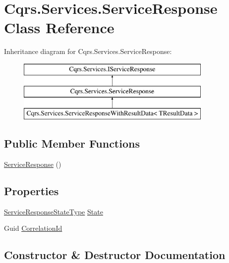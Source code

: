\hypertarget{classCqrs_1_1Services_1_1ServiceResponse}{}\section{Cqrs.\+Services.\+Service\+Response Class Reference}
\label{classCqrs_1_1Services_1_1ServiceResponse}
Inheritance diagram for Cqrs.\+Services.\+Service\+Response\+:\begin{figure}[H]
\begin{center}
\leavevmode
\includegraphics[height=3.000000cm]{classCqrs_1_1Services_1_1ServiceResponse}
\end{center}
\end{figure}
\subsection*{Public Member Functions}
\begin{DoxyCompactItemize}
\item 
\hyperlink{classCqrs_1_1Services_1_1ServiceResponse_a889c3d406ffbac960699e13616f9f38b}{Service\+Response} ()
\end{DoxyCompactItemize}
\subsection*{Properties}
\begin{DoxyCompactItemize}
\item 
\hyperlink{namespaceCqrs_1_1Services_a41411b784c4fcb7eed0cef2a5b522de0}{Service\+Response\+State\+Type} \hyperlink{classCqrs_1_1Services_1_1ServiceResponse_ab93fe1cf6395706bc77ee3d670854f24}{State}
\item 
Guid \hyperlink{classCqrs_1_1Services_1_1ServiceResponse_ad6b80b1b6d1122bcbac201f41ee37124}{Correlation\+Id}
\end{DoxyCompactItemize}


\subsection{Constructor \& Destructor Documentation}
\mbox{\label{classCqrs_1_1Services_1_1ServiceResponse_a889c3d406ffbac960699e13616f9f38b}} 
